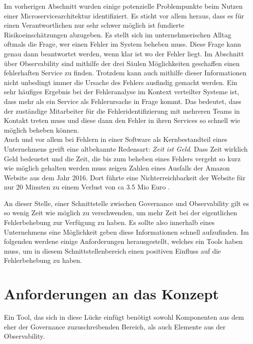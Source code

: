 \documentclass[
	12pt,
	BCOR=5mm,
	DIV=12,
	headinclude=on,
	footinclude=off,
	parskip=half,
	bibliography=totoc,
	listof=entryprefix,
	toc=listof,
	numbers=noenddot,
	plainfootsepline
]{scrreprt}
\begin{document}
Im vorherigen Abschnitt wurden einige potenzielle Problempunkte beim Nutzen einer Microservicearchitektur identifiziert. Es sticht vor allem heraus, dass es für einen Verantwortlichen nur sehr schwer möglich ist fundierte Risikoeinschätzungen abzugeben. Es stellt sich im unternehmerischen Alltag oftmals die Frage, wer einen Fehler im System beheben muss. Diese Frage kann genau dann beantwortet werden, wenn klar ist wo der Fehler liegt. Im Abschnitt über Observability sind mithilfe der drei Säulen Möglichkeiten geschaffen einen fehlerhaften Service zu finden. Trotzdem kann auch mithilfe dieser Informationen nicht unbedingt immer die Ursache des Fehlers ausfindig gemacht werden. Ein sehr häufiges Ergebnis bei der Fehleranalyse im Kontext verteilter Systeme ist, dass mehr als ein Service als Fehlerursache in Frage kommt. Das bedeutet, dass der zuständige Mitarbeiter für die Fehleridentifizierung mit mehreren Teams in Kontakt treten muss und diese dann den Fehler in ihren Services so schnell wie möglich beheben können. \\
Auch und vor allem bei Fehlern in einer Software als Kernbestandteil eines Unternehmens greift eine altbekannte Redensart: \textit{Zeit ist Geld}. Dass Zeit wirklich Geld bedeuetet und die Zeit, die bis zum beheben eines Fehlers vergeht so kurz wie möglich gehalten werden muss zeigen Zahlen eines Ausfalls der Amazon Website aus dem Jahr 2016. Dort führte eine Nichterreichbarkeit der Website für nur 20 Minuten zu einem Verlust von ca 3.5 Mio Euro .

An dieser Stelle, einer Schnittstelle zwischen Governance und Observability gilt es so wenig Zeit wie möglich zu verschwenden, um mehr Zeit bei der eigentlichen Fehlerbehebung zur Verfügung zu haben. Es sollte also innerhalb eines Unternehmens eine Möglichkeit geben diese Informationen schnell aufzufinden. Im folgenden werdene einige Anforderungen herausgestellt, welches ein Tools haben muss, um in diesem Schnittstellenbereich einen positiven Einfluss auf die Fehlerbehebung zu haben.

\section{Anforderungen an das Konzept}\label{chap:Anforderungen}

Ein Tool, das sich in diese Lücke einfügt benötigt sowohl Komponenten aus dem eher der Governance zuzuschreibenden Bereich, als auch Elemente aus der Observability.
\end{document}
